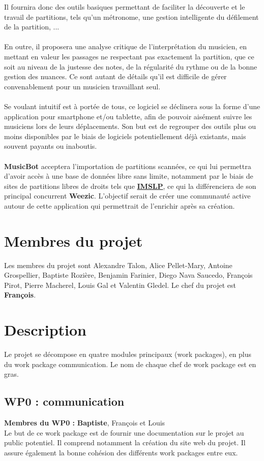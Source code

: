 \documentclass{article}
\begin{document}
Il fournira donc des outils basiques permettant de faciliter la découverte et le travail de partitions, tels qu'un métronome, une gestion intelligente du défilement de la partition, ...
\\ \\ \indent En outre, il proposera une analyse critique de l'interprétation du musicien, en mettant en valeur les passages ne respectant pas exactement la partition, que ce soit au niveau de la justesse des notes, de la régularité du rythme ou de la bonne gestion des nuances. Ce sont autant de détails qu'il est difficile de gérer convenablement pour un musicien travaillant seul.
\\ \\ \indent Se voulant intuitif est à portée de tous, ce logiciel se déclinera sous la forme d'une application pour smartphone et/ou tablette, afin de pouvoir aisément suivre les musiciens lors de leurs déplacements. Son but est de regrouper des outils plus ou moins disponibles par le biais de logiciels potentiellement déjà existants, mais souvent payants  ou inaboutis. \\ \\
\indent \textbf{MusicBot} acceptera l'importation de partitions scannées, ce qui lui permettra d'avoir accès à une base de données libre sans limite, notamment par le biais de sites de partitions libres de droits tels que \href{www.imslp.org}{\textbf{IMSLP}}, ce qui la différenciera de son principal concurrent \textbf{Weezic}. L'objectif serait de créer une communauté active autour de cette application qui permettrait de l'enrichir après sa création.


\section{Membres du projet}
Les membres du projet sont Alexandre Talon, Alice Pellet-Mary, Antoine Grospellier, Baptiste Rozière, Benjamin Farinier, Diego Nava Saucedo, François Pirot, Pierre Macherel, Louis Gal et Valentin Gledel. Le chef du projet est \textbf{François}.

\section{Description}
Le projet se décompose en quatre modules principaux (work packages), en plus du work package communication. Le nom de chaque chef de work package est en gras. 

\subsection{WP0 : communication}
\noindent \textbf{Membres du WP0 : } \textbf{Baptiste}, François et Louis\\
Le but de ce work package est de fournir une documentation sur le projet au public potentiel. Il comprend notamment la création du site web du projet. Il assure également la bonne cohésion des différents work packages entre eux.
\end{document}
